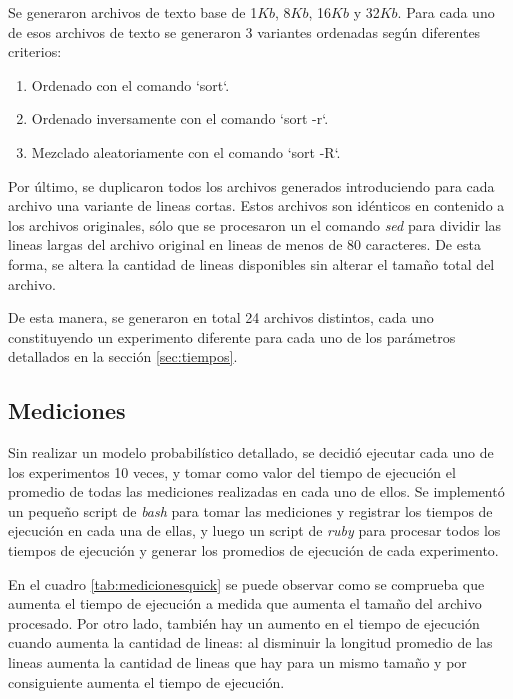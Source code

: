 \documentclass[a4paper,11pt]{article}
\begin{document}
Se generaron archivos de texto base de 1\(Kb\), 8\(Kb\), 16\(Kb\) y
32\(Kb\). Para cada uno de esos archivos de texto se generaron 3 variantes
ordenadas según diferentes criterios:

\begin{enumerate}
  \item Ordenado con el comando `sort`.
  \item Ordenado inversamente con el comando `sort -r`.
  \item Mezclado aleatoriamente con el comando `sort -R`.
\end{enumerate}

Por último, se duplicaron todos los archivos generados introduciendo para cada
archivo una variante de lineas cortas. Estos archivos son idénticos en
contenido a los archivos originales, sólo que se procesaron un el comando
\textit{sed} \cite{WIKISED} para dividir las lineas largas del archivo original
en lineas de menos de 80 caracteres. De esta forma, se altera la cantidad de
lineas disponibles sin alterar el tamaño total del archivo.

De esta manera, se generaron en total 24 archivos distintos, cada uno
constituyendo un experimento diferente para cada uno de los parámetros
detallados en la sección \ref{sec:tiempos}.

\subsection{Mediciones}

Sin realizar un modelo probabilístico detallado, se decidió ejecutar cada uno
de los experimentos 10 veces, y tomar como valor del tiempo de ejecución el
promedio de todas las mediciones realizadas en cada uno de ellos. Se implementó
un pequeño script de \textit{bash} \cite{WIKIBASH} para tomar las mediciones y
registrar los tiempos de ejecución en cada una de ellas, y luego un script de
\textit{ruby} \cite{WIKIRUBY} para procesar todos los tiempos de ejecución y
generar los promedios de ejecución de cada experimento.

En el cuadro \ref{tab:medicionesquick} se puede observar como se comprueba que
aumenta el tiempo de ejecución a medida que aumenta el tamaño del archivo
procesado. Por otro lado, también hay un aumento en el tiempo de ejecución
cuando aumenta la cantidad de lineas: al disminuir la longitud promedio de las
lineas aumenta la cantidad de lineas que hay para un mismo tamaño y por
consiguiente aumenta el tiempo de ejecución.
\end{document}
